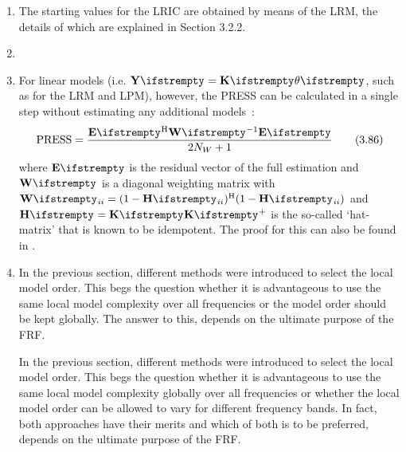 \documentclass{responseletter}
\begin{document}
\begin{enumerate}
\item 
{}
\begin{newquote}
The starting values for the \gls{LRIC} are obtained by means of the \gls{LRM}, the details of which are explained in Section 3.2.2.
\end{newquote}

  \item 
  
  \item 
  \begin{newquote}
 	For linear models (i.e. $\LocalVector{Y} = \LocalMatrix{K} \LocalVector{\theta}$, such as for the {LRM} and {LPM}), however, the {PRESS} can be calculated in a single step without estimating any additional models~\citep{Golub1979}:
	\begin{equation}
	\PRESS = \frac{\LocalVector{E}^{\HT} \LocalVector{W}^{-1} \LocalVector{E}}{2N_W + 1}
         \tag{3.86}
	\end{equation}
	where $\LocalVector{E}$ is the residual vector of the full estimation and $\LocalVector{W}$ is a diagonal weighting matrix with $\LocalVector{W}_{ii} = (1 - \LocalVector{H}_{ii})^{\HT} (1 - \LocalVector{H}_{ii})$ and
	$\LocalVector{H} = \LocalMatrix{K} \pinv{\LocalMatrix{K}}$ is the so-called `hat-matrix' that is known to be idempotent.
	The proof for this can also be found in \citet[Sec.~12.3.2]{Seber2003}.
  \end{newquote}

\item 
{}
\begin{oldquote}
In the previous section, different methods were introduced to select the local model order. 
This begs the question whether it is advantageous to use the same local model complexity over all frequencies or the model order should be kept globally. 
The answer to this, depends on the ultimate purpose of the \gls{FRF}.
\end{oldquote}
\begin{newquote}
In the previous section, different methods were introduced to select the local model order.
This begs the question whether it is advantageous to use the same local model complexity globally over all frequencies or whether the local model order can be allowed to vary for different frequency bands.
In fact, both approaches have their merits and which of both is to be preferred, depends on the ultimate purpose of the \gls{FRF}.
\end{newquote}


\end{enumerate}
\end{document}
